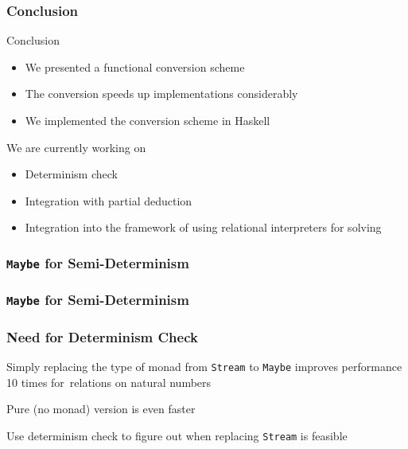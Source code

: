 \documentclass[xcolor=table, aspectratio=169]{beamer}
\newcommand{\backupbegin}{
   \newcounter{finalframe}
   \setcounter{finalframe}{\value{framenumber}}
}
\begin{document}
\begin{frame}[fragile]
  \frametitle{Conclusion}
Conclusion
  \begin{itemize}
    \item We presented a functional conversion scheme
    \item The conversion speeds up implementations considerably
    \item We implemented the conversion scheme in Haskell
  \end{itemize}

\vfill

We are currently working on
  \begin{itemize}
    \item Determinism check
    \item Integration with partial deduction
    \item Integration into the framework of using relational interpreters for solving
  \end{itemize}
\end{frame}





\appendix
\backupbegin

\begin{frame}[fragile]
  \frametitle{\lstinline[basicstyle=\Large]{Maybe} for Semi-Determinism}
\begin{center}
  \begin{minipage}{0.43\textwidth}
    
  \end{minipage}
\end{center}
\end{frame}


\begin{frame}[noframenumbering]
  \frametitle{\lstinline[basicstyle=\Large]{Maybe} for Semi-Determinism}
  \begin{center}
  \begin{minipage}{0.43\textwidth}
    
  \end{minipage}
\end{center}
\end{frame}

\begin{frame}[fragile]
  \frametitle{Need for Determinism Check}
\begin{center}
  Simply replacing the type of monad from \texttt{Stream} to \texttt{Maybe} improves performance 10 times for~relations on natural numbers
\end{center}

\begin{center}
  Pure (no monad) version is even faster
\end{center}

\vfill

\begin{center}
  Use determinism check to figure out when replacing \texttt{Stream} is feasible
\end{center}

\end{frame}
\end{document}
